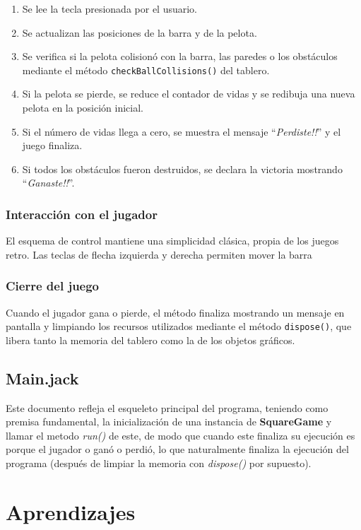 \documentclass[twocolumn]{article}
\begin{document}
	\begin{enumerate}
		\item Se lee la tecla presionada por el usuario.
		\item Se actualizan las posiciones de la barra y de la pelota.
		\item Se verifica si la pelota colisionó con la barra, las paredes o los obstáculos mediante el método \texttt{checkBallCollisions()} del tablero.
		\item Si la pelota se pierde, se reduce el contador de vidas y se redibuja una nueva pelota en la posición inicial.
		\item Si el número de vidas llega a cero, se muestra el mensaje “\emph{Perdiste!!}” y el juego finaliza.
		\item Si todos los obstáculos fueron destruidos, se declara la victoria mostrando “\emph{Ganaste!!}”.
	\end{enumerate}
	
	\subsubsection{Interacción con el jugador}
	El esquema de control mantiene una simplicidad clásica, propia de los juegos retro. Las teclas de flecha izquierda y derecha permiten mover la barra
	
	\subsubsection{Cierre del juego}
	Cuando el jugador gana o pierde, el método finaliza mostrando un mensaje en pantalla y limpiando los recursos utilizados mediante el método \texttt{dispose()}, que libera tanto la memoria del tablero como la de los objetos gráficos.
	\subsection{Main.jack}
	Este documento refleja el esqueleto principal del programa, teniendo como premisa fundamental, la inicialización de una instancia de \textbf{SquareGame} y llamar el metodo \emph{run()} de este, de modo que cuando este finaliza su ejecución es porque el jugador o ganó o perdió, lo que naturalmente finaliza la ejecución del programa (después de limpiar la memoria con \emph{dispose()} por supuesto). 
	
	\section{Aprendizajes}
	
\end{document}
